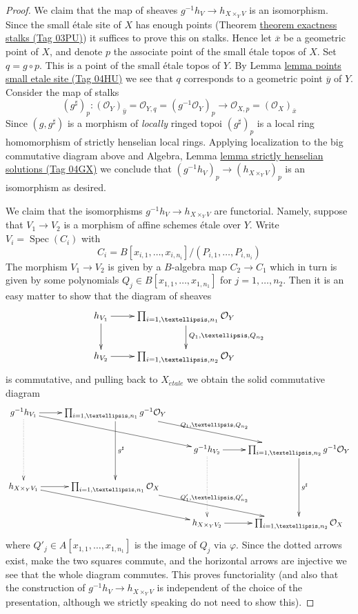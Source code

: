 \documentclass{amsart}
\theoremstyle{plain}
\theoremstyle{definition}
\theoremstyle{remark}
\numberwithin{equation}{subsection}
\def\Spec{\mathop{\mathrm{Spec}}}
\def\etale{{\acute{e}tale}}
\begin{document}
\begin{proof}
\medskip\noindent
We claim that the map of sheaves $g^{-1}h_V \to h_{X \times_Y V}$
is an isomorphism. Since the small \'etale site of $X$ has enough points
(Theorem \href{https://stacks.math.columbia.edu/tag/03PU}{theorem exactness stalks (Tag 03PU)})
it suffices to prove this on stalks. Hence let $\overline{x}$ be a
geometric point of $X$, and denote $p$ the associate point of the
small \'etale topos of $X$. Set $q = g \circ p$. This is a point of
the small \'etale topos of $Y$. By
Lemma \href{https://stacks.math.columbia.edu/tag/04HU}{lemma points small etale site (Tag 04HU)}
we see that $q$ corresponds to a geometric point $\overline{y}$ of
$Y$. Consider the map of stalks
$$
(g^\sharp)_p :
(\mathcal{O}_Y)_{\overline{y}} =
\mathcal{O}_{Y, q} =
(g^{-1}\mathcal{O}_Y)_p
\longrightarrow
\mathcal{O}_{X, p} =
(\mathcal{O}_X)_{\overline{x}}
$$
Since $(g, g^\sharp)$ is a morphism of {\it locally} ringed topoi
$(g^\sharp)_p$ is a local ring homomorphism of strictly henselian
local rings. Applying localization to the big commutative diagram above and
Algebra, Lemma \href{https://stacks.math.columbia.edu/tag/04GX}{lemma strictly henselian solutions (Tag 04GX)}
we conclude that $(g^{-1}h_V)_p \to (h_{X \times_Y V})_p$ is an isomorphism
as desired.

\medskip\noindent
We claim that the isomorphisms $g^{-1}h_V \to h_{X \times_Y V}$ are
functorial. Namely, suppose that $V_1 \to V_2$ is a morphism of affine
schemes \'etale over $Y$. Write
$V_i = \Spec(C_i)$ with
$$
C_i = B[x_{i, 1}, \ldots, x_{i, n_i}]/(P_{i, 1}, \ldots, P_{i, n_i})
$$
The morphism $V_1 \to V_2$ is given by a $B$-algebra map $C_2 \to C_1$
which in turn is given by some polynomials
$Q_j \in B[x_{1, 1}, \ldots, x_{1, n_1}]$ for $j = 1, \ldots, n_2$.
Then it is an easy matter to show that the diagram of sheaves
$$
\xymatrix{
h_{V_1} \ar[d] \ar[r] & \prod_{i = 1, \ldots, n_1} \mathcal{O}_Y
\ar[d]^{Q_1, \ldots, Q_{n_2}}\\
h_{V_2} \ar[r] & \prod_{i = 1, \ldots, n_2} \mathcal{O}_Y
}
$$
is commutative, and pulling back to $X_\etale$ we obtain the
solid commutative diagram
$$
\xymatrix{
g^{-1}h_{V_1} \ar@{..>}[dd] \ar[rrd] \ar[r] &
\prod_{i = 1, \ldots, n_1} g^{-1}\mathcal{O}_Y
\ar[dd]^{g^\sharp}
\ar[rrd]^{Q_1, \ldots, Q_{n_2}} \\
& & g^{-1}h_{V_2} \ar@{..>}[dd] \ar[r] &
\prod_{i = 1, \ldots, n_2} g^{-1}\mathcal{O}_Y
\ar[dd]^{g^\sharp} \\
h_{X \times_Y V_1} \ar[r] \ar[rrd] &
\prod\nolimits_{i = 1, \ldots, n_1} \mathcal{O}_X
\ar[rrd]^{Q'_1, \ldots, Q'_{n_2}} \\
& & h_{X \times_Y V_2} \ar[r] &
\prod\nolimits_{i = 1, \ldots, n_2} \mathcal{O}_X
}
$$
where $Q'_j \in A[x_{1, 1}, \ldots, x_{1, n_1}]$ is the image of
$Q_j$ via $\varphi$. Since the dotted arrows exist, make the
two squares commute, and the horizontal arrows are injective
we see that the whole diagram commutes. This proves functoriality
(and also that the construction of $g^{-1}h_V \to h_{X \times_Y V}$
is independent of the choice of the presentation, although we
strictly speaking do not need to show this).


\end{proof}
\end{document}
